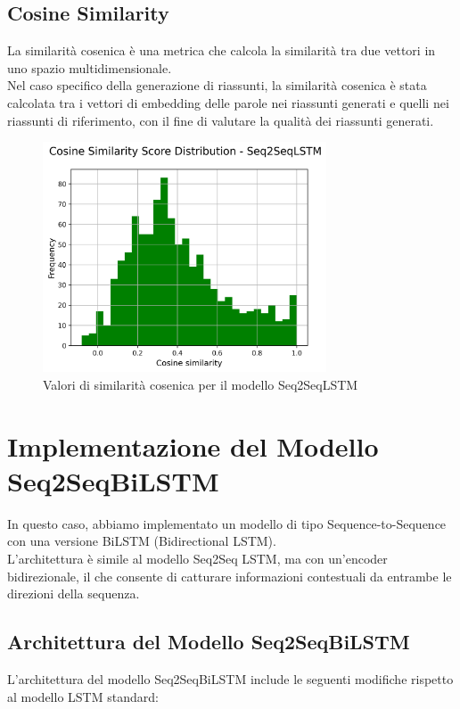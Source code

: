 \documentclass[a4paper, 12pt]{article}
\begin{document}
\subsection{Cosine Similarity}
La similarità cosenica è una metrica che calcola la similarità tra due vettori in uno spazio multidimensionale.\\
Nel caso specifico della generazione di riassunti, la similarità cosenica è stata calcolata tra i vettori di embedding delle parole nei riassunti generati e quelli nei riassunti di riferimento, con il fine di valutare la qualità dei riassunti generati.\\
\begin{figure}[H]
    \centering
    \includegraphics[width=0.75\textwidth]{media/Seq2SeqLSTM_cosine_similarity_scores.png}
    \caption{Valori di similarità cosenica per il modello Seq2SeqLSTM}
    \label{fig:cosine_similarity}
\end{figure}

\section{Implementazione del Modello Seq2SeqBiLSTM}

In questo caso, abbiamo implementato un modello di tipo Sequence-to-Sequence con una versione BiLSTM (Bidirectional LSTM).\\
L'architettura è simile al modello Seq2Seq LSTM, ma con un'encoder bidirezionale, il che consente di catturare informazioni contestuali da entrambe le direzioni della sequenza.

\subsection{Architettura del Modello Seq2SeqBiLSTM}
L'architettura del modello Seq2SeqBiLSTM include le seguenti modifiche rispetto al modello LSTM standard:
\end{document}
